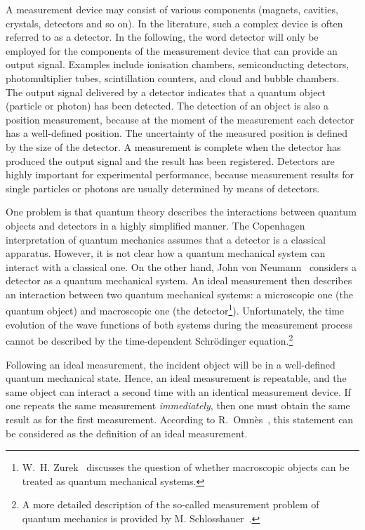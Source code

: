 \documentclass[12pt]{article}
\begin{document}
A measurement device may consist of various components (magnets, cavities, crystals, detectors and so on).  
In the literature, such a complex device is often referred to as a detector.  
In the following, the word detector will only be employed for the components of the measurement device that can provide an output signal.  
Examples include ionisation chambers, semiconducting detectors, photomultiplier tubes, scintillation counters, and cloud and bubble chambers.  
The output signal delivered by a detector indicates that a quantum object (particle or photon) has been detected.  
The detection of an object is also a position measurement, because at the moment of the measurement each detector has a well-defined position.  The uncertainty of the measured position is defined by the size of the detector.  
A measurement is complete when the detector has produced the output signal and the result has been registered.  Detectors are highly important for experimental performance, because measurement results for single particles or photons are usually determined by means of detectors.  

One problem is that quantum theory describes the interactions between quantum objects and detectors in a highly simplified manner.  
The Copenhagen interpretation of quantum mechanics assumes that a detector is a classical apparatus.  However, it is not clear how a quantum mechanical system can interact with a classical one.  
On the other hand, John von Neumann~\cite{Ne32} considers a detector as a quantum mechanical system.  An ideal measurement then describes an interaction between two quantum mechanical systems: a microscopic one (the quantum object) and macroscopic one (the detector\footnote{W.~H. Zurek~\cite{Zu91} discusses the question of whether macroscopic objects can be treated as quantum mechanical systems.}).  
Unfortunately, the time evolution of the wave functions of both systems during the measurement process cannot be described by the time-dependent Schr\"odinger equation.\footnote{A more detailed description of the so-called measurement problem of quantum mechanics is provided by M. Schlosshauer~\cite{Schl}.}   

Following an ideal measurement, the incident object will be in a well-defined quantum mechanical state.  Hence, an ideal measurement is repeatable, and the same object can interact a second time with an identical measurement device.  
If one repeats the same measurement \emph{immediately}, then one must obtain the same result as for the first measurement.  According to R.~Omn\`es~\cite{Om94}, this statement can be considered as the definition of an ideal measurement.  
\end{document}
